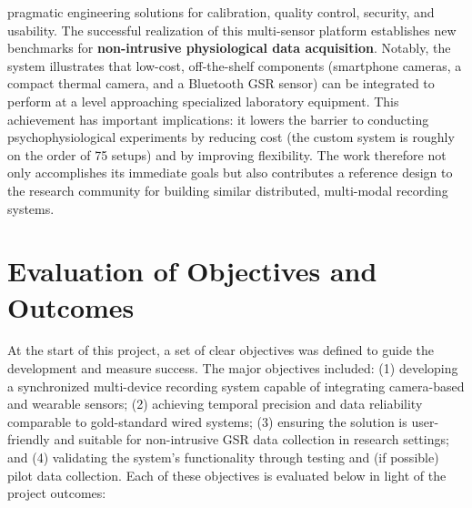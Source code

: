\documentclass[11pt,a4paper]{report}
\begin{document}
pragmatic engineering solutions for calibration, quality control,
security, and usability. The successful realization of this multi-sensor
platform establishes new benchmarks for \textbf{non-intrusive physiological
data acquisition}. Notably, the system illustrates that low-cost,
off-the-shelf components (smartphone cameras, a compact thermal camera,
and a Bluetooth GSR sensor) can be integrated to perform at a level
approaching specialized laboratory equipment. This achievement has
important implications: it lowers the barrier to conducting
psychophysiological experiments by reducing cost (the custom system is
roughly on the order of 75%
setups) and by improving flexibility. The work therefore not only
accomplishes its immediate goals but also contributes a reference design
to the research community for building similar distributed, multi-modal
recording systems.

\section{Evaluation of Objectives and Outcomes}

At the start of this project, a set of clear objectives was defined to
guide the development and measure success. The major objectives
included: (1) developing a synchronized multi-device recording system
capable of integrating camera-based and wearable sensors; (2) achieving
temporal precision and data reliability comparable to gold-standard
wired systems; (3) ensuring the solution is user-friendly and suitable
for non-intrusive GSR data collection in research settings; and (4)
validating the system's functionality through testing and (if possible)
pilot data collection. Each of these objectives is evaluated below in
light of the project outcomes:
\end{document}

